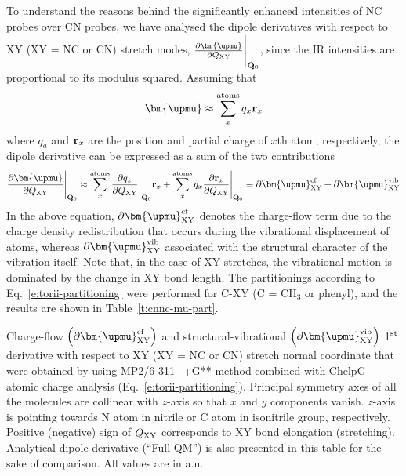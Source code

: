 \documentclass[a4paper,titlepage,twoside,fleqn,12pt]{book}
\newcommand{\BM}[1]{\bm{#1}}
\newcommand{\fderiv}[2]{\ensuremath{
    \frac{\partial #1}{\partial #2}}}
\begin{document}
\begin{refsection}
To understand the reasons behind the significantly enhanced intensities of NC probes over
CN probes, we have analysed the dipole derivatives with respect to XY (XY = NC or CN) stretch
modes, $\fderiv{{\BM \upmu}}{Q_{\rm XY}} \Bigg|_{{\bf Q}_{0}}$,
since the IR intensities are proportional to its modulus squared.
Assuming that
%
\begin{equation}
 {\BM \upmu} \approx \sum_x^{\rm atoms} q_x {\bf r}_x 
\end{equation}
%
where $q_a$ and ${\bf r}_x$ are the position and partial charge of $x$th atom, respectively,
the dipole derivative can be expressed as a sum of the two contributions
%
\begin{equation} \label{e:torii-partitioning}
 \fderiv{{\BM \upmu}}{Q_{\rm XY}} \Bigg|_{{\bf Q}_{0}} \approx
 \sum_x^{\rm atoms} \fderiv{q_x}{Q_{\rm XY}} \Bigg|_{{\bf Q}_{0}} {\bf r}_x 
  +
 \sum_x^{\rm atoms} q_x \fderiv{{\bf r}_x}{Q_{\rm XY}} \Bigg|_{{\bf Q}_{0}}
 \equiv 
 \partial {\BM \upmu}_{\rm XY}^{\rm cf} + \partial {\BM \upmu}_{\rm XY}^{\rm vib}
\end{equation}
%
In the above equation, $\partial {\BM \upmu}_{\rm XY}^{\rm cf}$ denotes the
charge\hyp{}flow term due to the charge density
redistribution that occurs during the vibrational displacement of atoms, 
whereas $\partial {\BM \upmu}_{\rm XY}^{\rm vib}$
associated with the structural character of the vibration itself. 
Note that, in the case of XY
stretches, the vibrational motion is dominated by the change 
in XY bond length. The 
partitionings according to Eq.~\eqref{e:torii-partitioning} 
were performed for C-XY (C = CH$_3$ or phenyl), and the 
results are shown in Table~\ref{t:cnnc-mu-part}.
%
\begin{table}[t!]
\caption{Charge\hyp{}flow $\left( \partial {\BM \upmu}_{\rm XY}^{\rm cf} \right)$
and structural\hyp{}vibrational $\left( \partial {\BM \upmu}_{\rm XY}^{\rm vib} \right)$
1$^{\rm st}$ derivative with respect to XY (XY = NC or CN) stretch normal coordinate 
that were obtained by using MP2/6-311++G** method combined with ChelpG atomic charge 
analysis (Eq.~\eqref{e:torii-partitioning}). 
Principal symmetry axes of all the molecules are collinear with $z$-axis so that $x$ and $y$ 
components vanish. $z$-axis is pointing towards N atom in nitrile or C atom in isonitrile group, 
respectively. Positive (negative) sign of $Q_{\rm XY}$ corresponds to XY bond elongation (stretching). 
Analytical dipole derivative (``Full QM'') is also presented in this table for the sake of 
comparison. All values are in a.u. 
\label{t:cnnc-mu-part}}

\end{table}
\end{refsection}
\end{document}
